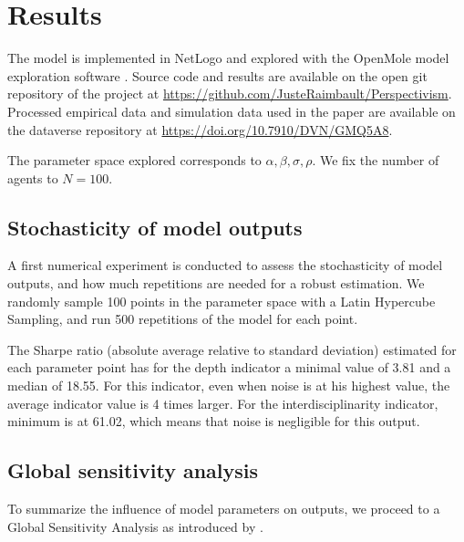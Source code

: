 \documentclass[utf8]{frontiersFPHY} %
\begin{document}
\section{Results}


The model is implemented in NetLogo \cite{tisue2004netlogo} and explored with the OpenMole model exploration software \cite{reuillon2013openmole}. Source code and results are available on the open git repository of the project at \url{https://github.com/JusteRaimbault/Perspectivism}. Processed empirical data and simulation data used in the paper are available on the dataverse repository at \url{https://doi.org/10.7910/DVN/GMQ5A8}.

The parameter space explored corresponds to $\alpha,\beta,\sigma,\rho$.
We fix the number of agents to $N=100$.

\subsection{Stochasticity of model outputs}

A first numerical experiment is conducted to assess the stochasticity of model outputs, and how much repetitions are needed for a robust estimation. We randomly sample 100 points in the parameter space with a Latin Hypercube Sampling, and run 500 repetitions of the model for each point. 

The Sharpe ratio (absolute average relative to standard deviation) estimated for each parameter point has for the depth indicator a minimal value of 3.81 and a median of 18.55. For this indicator, even when noise is at his highest value, the average indicator value is 4 times larger. For the interdisciplinarity indicator, minimum is at 61.02, which means that noise is negligible for this output.


\subsection{Global sensitivity analysis}


To summarize the influence of model parameters on outputs, we proceed to a Global Sensitivity Analysis as introduced by \cite{saltelli2008global}.
\end{document}
